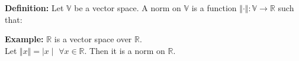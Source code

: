 \documentclass{article}
\begin{document}
\textbf{Definition: } Let $\mathbb{V}$ be a vector space. A norm on $\mathbb{V}$ is a function $\Vert \cdot \Vert: \mathbb{V} \to \mathbb{R}$ such that:
\textbf{Example: } $$ is a vector space over $$. \\
Let $\Vert x \Vert = \mid$ $\forall x \in {}$. Then it is a norm on $$. 

\bigbreak
\end{document}
